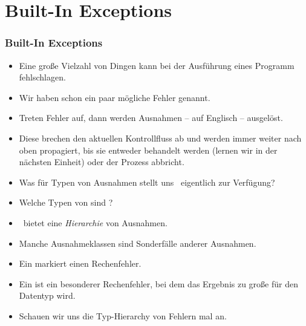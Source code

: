 \documentclass[aspectratio=169,mathserif,notheorems]{beamer}%
\begin{document}
\section{Built-In Exceptions}%
%
\begin{frame}%
\frametitle{Built-In Exceptions}%
\begin{itemize}%
\item Eine große Vielzahl von Dingen kann bei der Ausführung eines Programm fehlschlagen.%
%
\item<2-> Wir haben schon ein paar mögliche Fehler genannt.%
%
\item<3-> Treten Fehler auf, dann werden Ausnahmen -- auf Englisch  -- ausgelöst.%
%
\item<4-> Diese brechen den aktuellen Kontrollfluss ab und werden immer weiter nach oben propagiert, bis sie entweder behandelt werden (lernen wir in der nächsten Einheit) oder der Prozess abbricht.%
\item<5-> Was für Typen von Ausnahmen stellt uns \python\ eigentlich zur Verfügung?%
%
\item<6-> Welche Typen von  sind ?%
%
\item<7-> \python\ bietet eine \emph{Hierarchie} von Ausnahmen.%
%
\item<8-> Manche Ausnahmeklassen sind Sonderfälle anderer Ausnahmen.%
%
\item<9-> Ein  markiert einen Rechenfehler.%
%
\item<10-> Ein  ist ein besonderer Rechenfehler, bei dem das Ergebnis zu große für den Datentyp wird.%
%
\item<11-> Schauen wir uns die Typ-Hierarchy von Fehlern mal an\cite{PSF:P3D:TPSL:BIE}.%
\end{itemize}%
\end{frame}%
%
\end{document}
